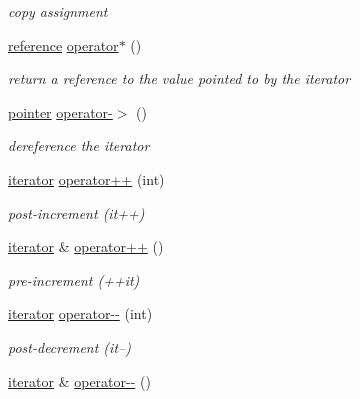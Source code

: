 \begin{DoxyCompactItemize}
\begin{DoxyCompactList}\small\item\em copy assignment \end{DoxyCompactList}\item 
\hyperlink{a00038_aefd248cac6493eed1e6ff53ba6a63eb2}{reference} \hyperlink{a00079_ab07728b4da636eda0a24e0a51b8b46d7}{operator$\ast$} ()\hypertarget{a00079_ab07728b4da636eda0a24e0a51b8b46d7}{}\label{a00079_ab07728b4da636eda0a24e0a51b8b46d7}

\begin{DoxyCompactList}\small\item\em return a reference to the value pointed to by the iterator \end{DoxyCompactList}\item 
\hyperlink{a00038_a1da96fc3054d547e7706d3a2f073f389}{pointer} \hyperlink{a00079_ae58cd597336ad125d9615cff87fcd87e}{operator-\/$>$} ()\hypertarget{a00079_ae58cd597336ad125d9615cff87fcd87e}{}\label{a00079_ae58cd597336ad125d9615cff87fcd87e}

\begin{DoxyCompactList}\small\item\em dereference the iterator \end{DoxyCompactList}\item 
\hyperlink{a00079}{iterator} \hyperlink{a00079_a2943e49b3d88e6ee5793c5923ab2ede9}{operator++} (int)\hypertarget{a00079_a2943e49b3d88e6ee5793c5923ab2ede9}{}\label{a00079_a2943e49b3d88e6ee5793c5923ab2ede9}

\begin{DoxyCompactList}\small\item\em post-\/increment (it++) \end{DoxyCompactList}\item 
\hyperlink{a00079}{iterator} \& \hyperlink{a00079_a050b7fa21051ea57e5b0cc03668b5d4a}{operator++} ()\hypertarget{a00079_a050b7fa21051ea57e5b0cc03668b5d4a}{}\label{a00079_a050b7fa21051ea57e5b0cc03668b5d4a}

\begin{DoxyCompactList}\small\item\em pre-\/increment (++it) \end{DoxyCompactList}\item 
\hyperlink{a00079}{iterator} \hyperlink{a00079_ab4f238aa5fcf452b1884b748b0395b1f}{operator-\/-\/} (int)\hypertarget{a00079_ab4f238aa5fcf452b1884b748b0395b1f}{}\label{a00079_ab4f238aa5fcf452b1884b748b0395b1f}

\begin{DoxyCompactList}\small\item\em post-\/decrement (it--) \end{DoxyCompactList}\item 
\hyperlink{a00079}{iterator} \& \hyperlink{a00079_ab3679dc63b3a59edb98b1c2b96d8683c}{operator-\/-\/} ()\hypertarget{a00079_ab3679dc63b3a59edb98b1c2b96d8683c}{}\label{a00079_ab3679dc63b3a59edb98b1c2b96d8683c}


\end{DoxyCompactItemize}

